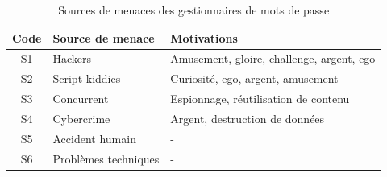 \begin{table}[H]
	\centering
	\begin{tabular}{cll}
		\hline
		Code & Source de menace                & Motivations                               \\ \hline
		S1   & Hackers & Amusement, gloire, challenge, argent, ego \\
		S2   & Script kiddies                  & Curiosité, ego, argent, amusement         \\
		S3   & Concurrent                      & Espionnage, réutilisation de contenu      \\
		S4   & Cybercrime                      & Argent, destruction de données            \\
		S5   & Accident humain                 & -                                         \\
		S6   & Problèmes techniques            & -                                         \\ \hline
	\end{tabular}
\caption{Sources de menaces des gestionnaires de mots de passe}
\end{table}

